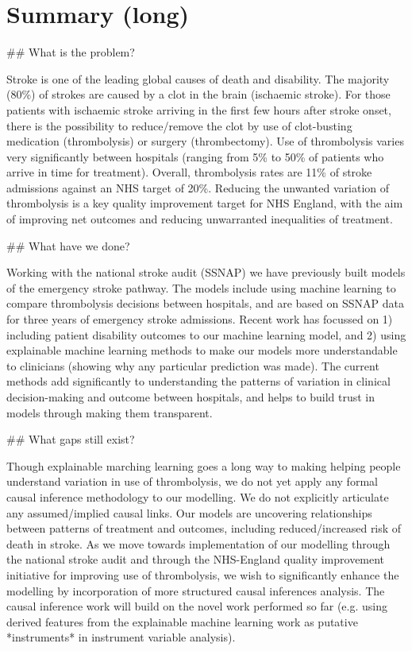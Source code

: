 \section{Summary (long)}
\begin{markdown}



## What is the problem?

Stroke is one of the leading global causes of death and disability. The majority (80\%) of strokes are caused by a clot in the brain (ischaemic stroke). For those patients with ischaemic stroke arriving in the first few hours after stroke onset, there is the possibility to reduce/remove the clot by use of clot-busting medication (thrombolysis) or surgery (thrombectomy). Use of thrombolysis varies very significantly between hospitals (ranging from 5\% to 50\% of patients who arrive in time for treatment). Overall, thrombolysis rates are 11\% of stroke admissions against an NHS target of 20\%. Reducing the unwanted variation of thrombolysis is a key quality improvement target for NHS England, with the aim of improving net outcomes and reducing unwarranted inequalities of treatment.

## What have we done?

Working with the national stroke audit (SSNAP) we have previously built models of the emergency stroke pathway. The models include using machine learning to compare thrombolysis decisions between hospitals, and are based on SSNAP data for three years of emergency stroke admissions. Recent work has focussed on 1) including patient disability outcomes to our machine learning model, and 2) using explainable machine learning methods to make our models more understandable to clinicians (showing why any particular prediction was made). The current methods add significantly to understanding the patterns of variation in clinical decision-making and outcome between hospitals, and helps to build trust in models through making them transparent.

## What gaps still exist?

Though explainable marching learning goes a long way to making helping people understand variation in use of thrombolysis, we do not yet apply any formal causal inference methodology to our modelling. We do not explicitly articulate any assumed/implied causal links. Our models are uncovering relationships between patterns of treatment and outcomes, including reduced/increased risk of death in stroke. As we move towards implementation of our modelling through the national stroke audit and through the NHS-England quality improvement initiative for improving use of thrombolysis, we wish to significantly enhance the modelling by incorporation of more structured causal inferences analysis. The causal inference work will build on the novel work performed so far (e.g. using derived features from the explainable machine learning work as putative *instruments* in instrument variable analysis).


\end{markdown}
